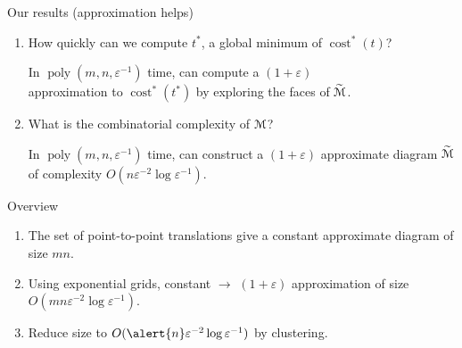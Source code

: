 \documentclass[xcolor={dvipsnames,usenames}]{beamer}
\newcommand{\eps}{\varepsilon}
\DeclareMathOperator{\poly}{poly}
\DeclareMathOperator{\cost}{cost}
\newcommand{\M}{\EuScript{M}}
\newcommand{\tildeM}{\widetilde{\EuScript{M}}}
\begin{document}
\begin{frame}{Our results (approximation helps)}
\begin{enumerate}
\item {\large How quickly can we \alert{compute $t^*$}, a global minimum of $\cost^*(t)$?}
	\begin{theorem}
	In $\poly(m, n, \eps^{-1})$ time, can compute a $(1+\eps)$ \\
	\alert{approximation to $\cost^*(t^*)$} by exploring the faces of $\tildeM$.
	\end{theorem}
\item {\large What is the \alert{combinatorial complexity of $\M$}?}
	\begin{theorem}
	In $\poly(m, n, \eps^{-1})$ time, can construct a $(1+\eps)$
	\alert{approximate diagram} $\tildeM$ of complexity
	$O(n\eps^{-2}\log\eps^{-1})$.
	\end{theorem}
\end{enumerate}
\end{frame}

\begin{frame}{Overview}
\begin{enumerate}
\item The set of \alert{point-to-point translations} give a constant
	approximate diagram of size $mn$.
\pause
\item Using exponential grids, constant $\rightarrow$ \alert{$(1+\eps)$ approximation}
	of size $O(mn\eps^{-2}\log\eps^{-1})$.
\pause
\item Reduce size to $O(\alert{n}\eps^{-2}\log\eps^{-1})$ by clustering.
\end{enumerate}
\end{frame}
\end{document}
